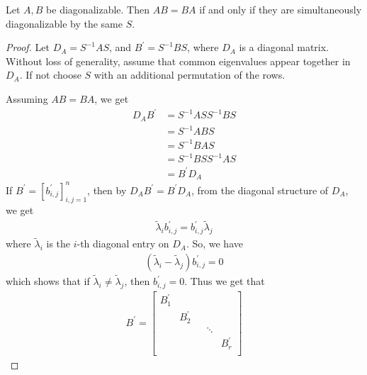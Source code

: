 \begin{theorem}
  Let $A, B$ be diagonalizable. Then $AB = BA$ if and only if they
  are simultaneously diagonalizable by the same $S$.
\end{theorem}
\begin{proof}
  Let $D_A = S^{-1} A S$, and $B^\prime = S^{-1} B S$, where $D_A$ is
  a diagonal matrix. Without loss of generality, assume that common
  eigenvalues appear together in $D_A$. If not choose $S$ with an
  additional permutation of the rows.

  Assuming $AB = BA$, we get
  \begin{align*}
    D_AB^\prime &= S^{-1} ASS^{-1}BS \\
    &= S^{-1}ABS \\
    &= S^{-1}BAS \\
    &= S^{-1}BSS^{-1}AS \\
    &= B^\prime D_A
  \end{align*}
  If $B^\prime = [b_{i, j}^\prime]_{i, j = 1}^n$, then by $D_A
  B^\prime = B^\prime D_A$, from the diagonal structure of $D_A$, we get
  \begin{align*}
    \tilde{\lambda}_ib_{i, j}^\prime = b_{i, j}^\prime \tilde{\lambda}_j
  \end{align*}
  where $\tilde{\lambda}_i$ is the $i$-th diagonal entry on $D_A$.
  So, we have
  \begin{align*}
    (\tilde{ \lambda}_i - \tilde{\lambda}_j) b_{i, j}^\prime = 0
  \end{align*}
  which shows that if $\tilde{ \lambda}_i \neq \tilde{\lambda}_j$,
  then $b_{i, j}^\prime = 0$. Thus we get that
  \begin{align*}
    B^\prime =
    \begin{bmatrix}%
      B_1^\prime &  &  & \\
      & B_2^\prime &   & \\
      &  &  & \ddots  & \\
      &  & &   & B_r^\prime \\
    \end{bmatrix}
  \end{align*}


\end{proof}
